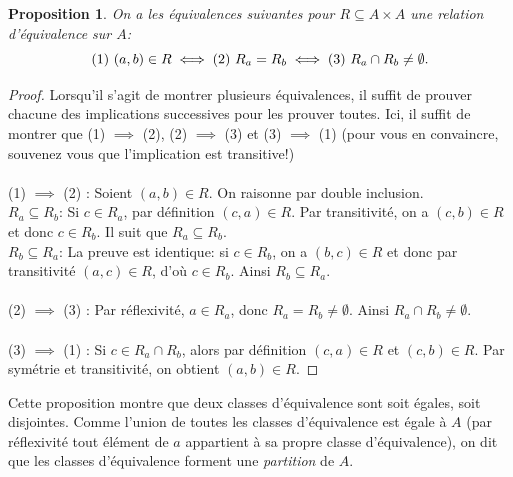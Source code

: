 \documentclass[oneside,12pt,french,table]{book}
\newtheorem{prop}{Proposition}[section]
\theoremstyle{definition}
\theoremstyle{definition}
\theoremstyle{definition}
\begin{document}
\begin{prop}
On a les équivalences suivantes pour $R\subseteq A\times A$ une relation d'équivalence sur $A$:
$$\textnormal{(1) } (a,b)\in R \iff \textnormal{(2) } R_a=R_b \iff \textnormal{(3) } R_a \cap R_b\neq \emptyset.$$
\end{prop}
\begin{proof} Lorsqu'il s'agit de montrer plusieurs équivalences, il suffit de prouver chacune des implications successives pour les prouver toutes. Ici, il suffit de montrer que (1) $\implies$ (2), (2) $\implies$ (3) et (3) $\implies$ (1) (pour vous en convaincre, souvenez vous que l'implication est transitive!) \\ \\
(1) $\implies$ (2) : Soient $(a,b) \in R$. On raisonne par double inclusion.\\
\underline{$R_a \subseteq R_b$}: Si $c \in R_a$, par définition $(c,a) \in R$. Par transitivité, on a $(c,b) \in R$ et donc $c \in R_b$. Il suit que $R_a \subseteq R_b$. \\
\underline{$R_b \subseteq R_a$}: La preuve est identique: si $c \in R_b$, on a $(b,c) \in R$ et donc par transitivité $(a,c) \in R$, d'où $c \in R_b$. Ainsi $R_b \subseteq R_a$.
\\ \\
(2) $\implies$ (3) : Par réflexivité, $a \in R_a$, donc $R_a = R_b \neq \emptyset$. Ainsi $R_a \cap R_b \neq \emptyset$.
\\ \\
(3) $\implies$ (1) : Si $c \in R_a \cap R_b$, alors par définition $(c,a) \in R$ et $(c,b) \in R$. Par symétrie et transitivité, on obtient $(a,b) \in R$.
\end{proof}
Cette proposition montre que deux classes d'équivalence sont soit égales, soit disjointes. Comme l'union de toutes les classes d'équivalence est égale à $A$ (par réflexivité tout élément de $a$ appartient à sa propre classe d'équivalence), on dit que les classes d'équivalence forment une \textit{partition} de $A$.
\end{document}
